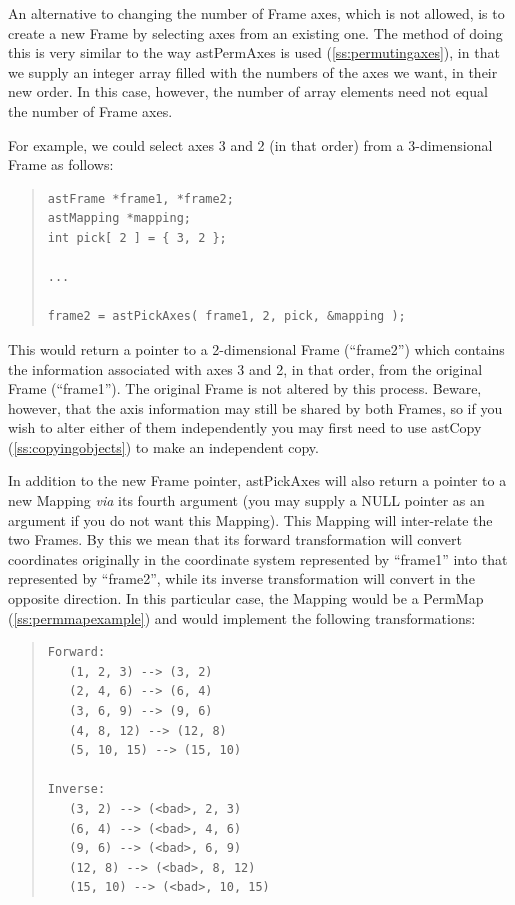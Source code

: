 \documentclass[twoside,11pt]{article}
\newcommand{\htmlref}[2]{#1}
\newcommand{\secref}[1]{\S\ref{#1}}
\renewcommand{\secref}[1]{\ref{#1}}
\begin{document}
An alternative to changing the number of \htmlref{Frame}{Frame} axes, which is not
allowed, is to create a new Frame by selecting axes from an existing
one. The method of doing this is very similar to the way \htmlref{astPermAxes}{astPermAxes}
is used (\secref{ss:permutingaxes}), in that we supply an integer
array filled with the numbers of the axes we want, in their new
order. In this case, however, the number of array elements need not
equal the number of Frame axes.

For example, we could select axes 3 and 2 (in that order) from a
3-dimensional Frame as follows:

\begin{quote}
\small
\begin{verbatim}
astFrame *frame1, *frame2;
astMapping *mapping;
int pick[ 2 ] = { 3, 2 };

...

frame2 = astPickAxes( frame1, 2, pick, &mapping );
\end{verbatim}
\normalsize
\end{quote}

This would return a pointer to a 2-dimensional Frame (``frame2'')
which contains the information associated with axes 3 and 2, in that
order, from the original Frame (``frame1''). The original Frame is not
altered by this process. Beware, however, that the axis information
may still be shared by both Frames, so if you wish to alter either of
them independently you may first need to use \htmlref{astCopy}{astCopy}
(\secref{ss:copyingobjects}) to make an independent copy.

In addition to the new Frame pointer, \htmlref{astPickAxes}{astPickAxes} will also return a
pointer to a new \htmlref{Mapping}{Mapping} {\em{via}} its fourth argument (you may supply a
NULL pointer as an argument if you do not want this Mapping).  This
Mapping will inter-relate the two Frames. By this we mean that its
forward transformation will convert coordinates originally in the
coordinate system represented by ``frame1'' into that represented by
``frame2'', while its inverse transformation will convert in the
opposite direction. In this particular case, the Mapping would be a
\htmlref{PermMap}{PermMap} (\secref{ss:permmapexample}) and would implement the following
transformations:

\begin{quote}
\begin{verbatim}
Forward:
   (1, 2, 3) --> (3, 2)
   (2, 4, 6) --> (6, 4)
   (3, 6, 9) --> (9, 6)
   (4, 8, 12) --> (12, 8)
   (5, 10, 15) --> (15, 10)

Inverse:
   (3, 2) --> (<bad>, 2, 3)
   (6, 4) --> (<bad>, 4, 6)
   (9, 6) --> (<bad>, 6, 9)
   (12, 8) --> (<bad>, 8, 12)
   (15, 10) --> (<bad>, 10, 15)
\end{verbatim}
\end{quote}
\end{document}
